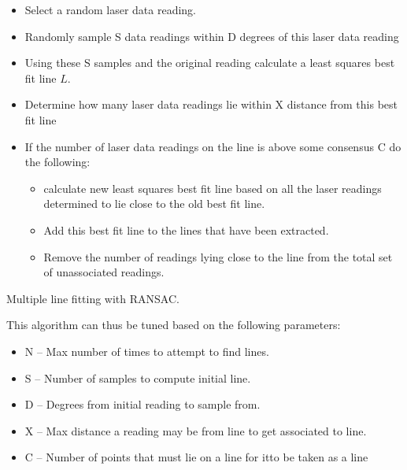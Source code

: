 \begin{algorithm}[H]
\begin{algorithmic}

	\begin{itemize}
	\item Select a random laser data reading. 
	\item Randomly sample S data readings within D degrees of this laser 
	data reading 
	\item Using these S samples and the original reading calculate a 
	least squares best fit line $ L $. 
	\item Determine how many laser data readings lie within X distance 
	from this best fit line
	\item If the number of laser data readings on the line is above some 
	consensus C do the following: 
		\begin{itemize}
			\item calculate new least squares best fit line based on all 
			the laser readings determined to lie close to the old best fit 
			line. 
			\item Add this best fit line to the lines that have been extracted. 
			\item Remove the number of readings lying close to the line from the 
			total set of unassociated readings.
		\end{itemize}
	\end{itemize}
	\EndWhile
\end{algorithmic}
	\caption{Multiple line fitting with RANSAC.}
	\label{alg: RANSAC algorithm}
\end{algorithm}
This algorithm can thus be tuned based on the following parameters: 
\begin{itemize}
\item N – Max number of times to attempt to find lines. 
\item S – Number of samples to compute initial line. 
\item D – Degrees from initial reading to sample from. 
\item X – Max distance a reading may be from line to get associated to line. 
\item C – Number of points that must lie on a line for itto be taken as a line
\end{itemize}


